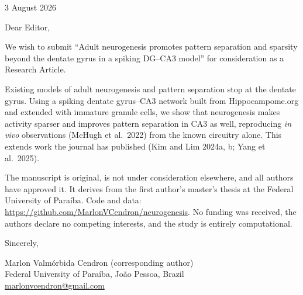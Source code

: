 \documentclass[11pt,a4paper]{article}
\begin{document}
3 August 2026

Dear Editor,

We wish to submit ``Adult neurogenesis promotes pattern separation and sparsity beyond
the dentate gyrus in a spiking DG--CA3 model'' for consideration as a Research Article.

Existing models of adult neurogenesis and pattern separation stop at the dentate gyrus.
Using a spiking dentate gyrus--CA3 network built from Hippocampome.org and extended with
immature granule cells, we show that neurogenesis makes activity sparser and improves
pattern separation in CA3 as well, reproducing \textit{in vivo} observations (McHugh et
al.\ 2022) from the known circuitry alone. This extends work the journal has published
(Kim and Lim 2024a, b; Yang et al.\ 2025).

The manuscript is original, is not under consideration elsewhere, and all authors have
approved it. It derives from the first author's master's thesis at the Federal University
of Para\'iba. Code and data: \url{https://github.com/MarlonVCendron/neurogenesis}. No
funding was received, the authors declare no competing interests, and the study is
entirely computational.

Sincerely,

\vspace{1.5em}

Marlon Valm\'orbida Cendron (corresponding author)\\
Federal University of Para\'iba, Jo\~ao Pessoa, Brazil\\
\href{mailto:marlonvcendron@gmail.com}{marlonvcendron@gmail.com}
\end{document}
